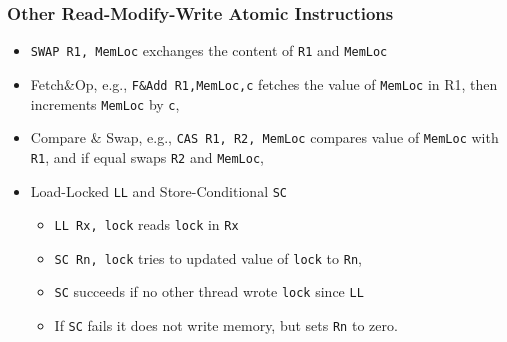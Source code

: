 \documentclass{beamer}
\newcommand{\emp}[1]{\textcolor{DikuRed}{ #1}}
\begin{document}
\begin{frame}[fragile,t]
\frametitle{Other Read-Modify-Write Atomic Instructions}

\begin{itemize}
    \item \emp{\tt SWAP R1, MemLoc} exchanges the content of {\tt R1} and {\tt MemLoc}\bigskip

    \item Fetch\&Op, e.g., \emp{\tt F\&Add R1,MemLoc,c} fetches the value of {\tt MemLoc} in R1, 
            then increments {\tt MemLoc} by {\tt c},\bigskip

    \item Compare \& Swap, e.g., \emp{\tt CAS R1, R2, MemLoc} compares 
            value of {\tt MemLoc} with {\tt R1}, and if equal swaps {\tt R2} and {\tt MemLoc},\bigskip

    \item Load-Locked {\tt LL} and Store-Conditional {\tt SC}\smallskip
        \begin{itemize}
            \item \emp{\tt LL Rx, lock} reads {\tt lock} in {\tt Rx}\smallskip
            \item \emp{\tt SC Rn, lock} tries to updated value of {\tt lock} to {\tt Rn},\smallskip 
            \item {\tt SC} succeeds if no other thread wrote {\tt lock} since {\tt LL}\smallskip
            \item If {\tt SC} fails it does not write memory, but sets {\tt Rn} to zero.
        \end  {itemize}
\end  {itemize}

\end{frame}
\end{document}
